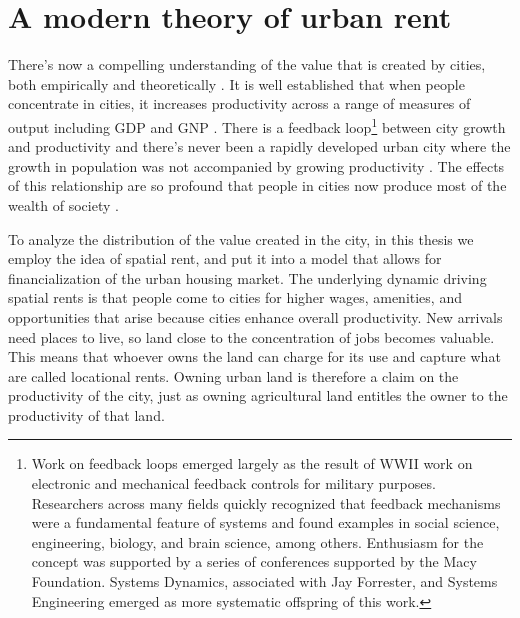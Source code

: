 \section{A modern theory of urban rent}
There's now a compelling understanding of the value that is created by cities, both empirically and theoretically \cite{jacobsEconomyCities1969, spenceUrbanizationGrowth2009, bettencourtIntroductionUrbanScience2021}. 
It is well established that when people concentrate in cities, it increases productivity across a range of measures of output including GDP and GNP \cite{bettencourtIntroductionUrbanScience2021}. There is a feedback loop\footnote{Work on feedback loops emerged largely as the result of WWII work on electronic and mechanical feedback controls for military purposes. Researchers across many fields %
quickly recognized that feedback mechanisms were a fundamental feature of systems and found examples in social science, engineering, biology, and brain science, among others. Enthusiasm for the concept was supported by a series of conferences supported by the Macy Foundation. %
Systems Dynamics, associated with Jay Forrester, and Systems Engineering emerged as more systematic offspring of this work.} %
between city growth and productivity and there's never been a rapidly developed urban city where the growth in population was not accompanied by growing productivity \cite{annezUrbanizationGrowthSetting2009}.  %
The effects of this relationship are so profound that people in cities now produce most of the wealth of society \cite{bettencourtIntroductionUrbanScience2021}. %


To analyze the distribution of the value created in the city, in this thesis we employ the idea of spatial rent, and put it into a model that allows for financialization of the urban housing market. The underlying dynamic driving spatial rents is that people come to cities for higher wages, amenities, and opportunities that arise because cities enhance overall productivity. New arrivals need places to live, so land close to the concentration of jobs becomes valuable. This means that whoever owns the land can charge for its use and capture what are called \glspl{locational rent}. Owning urban land is therefore a claim on the productivity of the city, just as owning agricultural land entitles the owner to the productivity of that land. %



